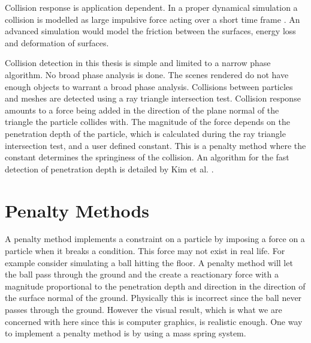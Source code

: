 Collision response is application dependent. In a proper dynamical simulation a
collision is modelled as large impulsive force acting over a short time frame
\cite{Watt, Otte}. An advanced simulation would model the friction between the
surfaces, energy loss and deformation of surfaces. 

Collision detection in this thesis is simple and limited to a narrow phase
algorithm. No broad phase analysis is done. The scenes rendered do not have
enough objects to warrant a broad phase analysis. Collisions between particles
and meshes are detected using a ray triangle intersection test. Collision
response amounts to a force being added in the direction of the plane normal of
the triangle the particle collides with. The magnitude of the force depends on
the penetration depth of the particle, which is calculated during the ray
triangle intersection test, and a user defined constant. This is a
penalty method where the constant determines the springiness of the collision.
An algorithm for the fast detection of penetration
depth is detailed by Kim et al. \cite{FastPenDepth}.

\section{Penalty Methods}
\label{Sec:PenaltyMethod}
A penalty method implements a constraint on a particle by imposing a force on a
particle when it breaks a condition. This force may not exist in real life. For
example consider simulating a ball hitting the floor. A penalty method will let
the ball pass through the ground and the create a reactionary force with a
magnitude proportional to the penetration depth and direction in the direction
of the surface normal of the ground. Physically this is incorrect since the ball
never passes through the ground. However the visual result, which is what we are
concerned with here since this is computer graphics, is realistic enough. One
way to implement a penalty method is by using a mass spring system.
